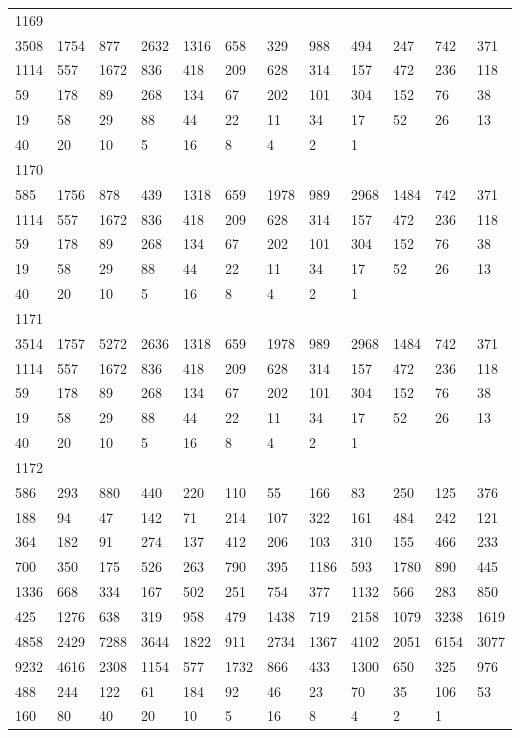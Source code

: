 \begin{longtable}{llllllllllll}
1169&&&&&&&&&&&\\
3508& 1754& 877& 2632& 1316& 658& 329& 988& 494& 247& 742& 371\\
1114& 557& 1672& 836& 418& 209& 628& 314& 157& 472& 236& 118\\
59& 178& 89& 268& 134& 67& 202& 101& 304& 152& 76& 38\\
19& 58& 29& 88& 44& 22& 11& 34& 17& 52& 26& 13\\
40& 20& 10& 5& 16& 8& 4& 2& 1& \\

1170&&&&&&&&&&&\\
585& 1756& 878& 439& 1318& 659& 1978& 989& 2968& 1484& 742& 371\\
1114& 557& 1672& 836& 418& 209& 628& 314& 157& 472& 236& 118\\
59& 178& 89& 268& 134& 67& 202& 101& 304& 152& 76& 38\\
19& 58& 29& 88& 44& 22& 11& 34& 17& 52& 26& 13\\
40& 20& 10& 5& 16& 8& 4& 2& 1& \\

1171&&&&&&&&&&&\\
3514& 1757& 5272& 2636& 1318& 659& 1978& 989& 2968& 1484& 742& 371\\
1114& 557& 1672& 836& 418& 209& 628& 314& 157& 472& 236& 118\\
59& 178& 89& 268& 134& 67& 202& 101& 304& 152& 76& 38\\
19& 58& 29& 88& 44& 22& 11& 34& 17& 52& 26& 13\\
40& 20& 10& 5& 16& 8& 4& 2& 1& \\

1172&&&&&&&&&&&\\
586& 293& 880& 440& 220& 110& 55& 166& 83& 250& 125& 376\\
188& 94& 47& 142& 71& 214& 107& 322& 161& 484& 242& 121\\
364& 182& 91& 274& 137& 412& 206& 103& 310& 155& 466& 233\\
700& 350& 175& 526& 263& 790& 395& 1186& 593& 1780& 890& 445\\
1336& 668& 334& 167& 502& 251& 754& 377& 1132& 566& 283& 850\\
425& 1276& 638& 319& 958& 479& 1438& 719& 2158& 1079& 3238& 1619\\
4858& 2429& 7288& 3644& 1822& 911& 2734& 1367& 4102& 2051& 6154& 3077\\
9232& 4616& 2308& 1154& 577& 1732& 866& 433& 1300& 650& 325& 976\\
488& 244& 122& 61& 184& 92& 46& 23& 70& 35& 106& 53\\
160& 80& 40& 20& 10& 5& 16& 8& 4& 2& 1& \\


\end{longtable}
